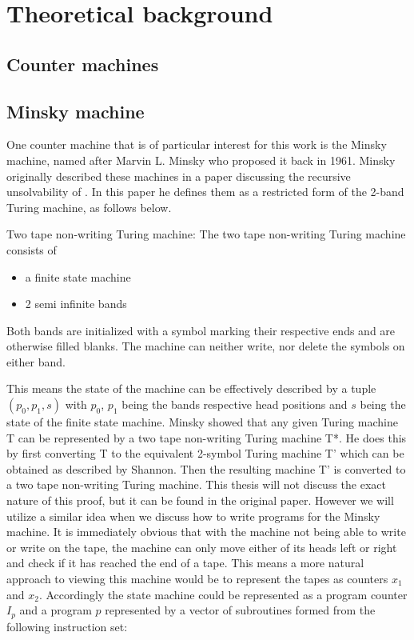 \chapter{Theoretical background}
\section{Counter machines}

\section{Minsky machine}
One counter machine that is of particular interest for this work is the Minsky machine, named after Marvin L. Minsky who proposed it back in 1961. Minsky originally described these machines in a paper discussing the recursive unsolvability of \cite{10.2307/1970290}. In this paper he defines them as a restricted form of the 2-band Turing machine, as follows below.
\begin{definition}{Two tape non-writing Turing machine:}
The two tape non-writing Turing machine consists of
\begin{itemize}
\item a finite state machine
\item 2 semi infinite bands
\end{itemize}
Both bands are initialized with a symbol marking their respective ends and are otherwise filled blanks.
The machine can neither write, nor delete the symbols on either band.
\end{definition}
This means the state of the machine can be effectively described by a tuple $(p_0, p_1, s)$ with $p_0$, $p_1$ being the bands respective head positions and $s$ being the state of the finite state machine.
Minsky showed that any given Turing machine T can be represented by a two tape non-writing Turing machine T*\cite{10.2307/1970290}. He does this by first converting T to the equivalent 2-symbol Turing machine T' which can be obtained as described by Shannon\cite{Shannon1971-SHAAUT-2}. Then the resulting machine T' is converted to a two tape non-writing Turing machine. This thesis will not discuss the exact nature of this proof, but it can be found in the original paper. However we will utilize a similar idea  when we discuss how to write programs for the Minsky machine.
It is immediately obvious that with the machine not being able to write or write on the tape, the machine can only move either of its heads left or right and check if it has reached the end of a tape. This means a more natural approach to viewing this machine would be to represent the tapes as counters $x_1$ and $x_2$. Accordingly the state machine could be represented as a program counter $I_p$ and a program $p$ represented by a vector of subroutines formed from the following instruction set:
